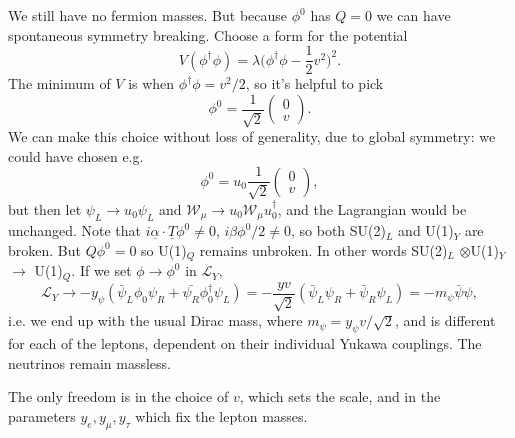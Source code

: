 We still have no fermion masses. But because $\phi^0$ has $Q=0$ we can have spontaneous symmetry breaking. Choose a form for the potential
\begin{equation}
V(\phi^\dagger \phi) = \lambda \bigg(\phi^\dagger \phi - \frac{1}{2}v^2\bigg)^2.
\end{equation}
The minimum of $V$ is when $\phi^\dagger \phi = v^2/2$, so it's helpful to pick 
\[\phi^0 = \frac{1}{\sqrt{2}}\left( \begin{array}{cc}
0   \\
v   \end{array} \right). \]
We can make this choice without loss of generality, due to global symmetry: we could have chosen e.g.
\[\phi^0 = u_0\frac{1}{\sqrt{2}} \left( \begin{array}{cc}
0   \\
v   \end{array} \right), \]
but then let $\psi_L \to u_0 \psi_L$ and $\mathcal{W}_\mu \to u_0 \mathcal{W}_\mu u_0^\dagger$, and the Lagrangian would be unchanged.
Note that $i \underline{\alpha}\cdot \underline{T} \phi^0 \neq 0$, $i\beta\phi^0/2 \neq 0$, so both SU(2)$_L$ and U(1)$_Y$ are broken. But $Q\phi^0 = 0$ so U(1)$_Q$ remains unbroken. In other words SU(2)$_L$ $\otimes$U(1)$_Y$ $\to$ U(1)$_Q$. If we set $\phi \to \phi^0$ in $\mathcal{L}_Y$,
\begin{equation}
\mathcal{L}_Y \to -y_\psi (\bar{\psi}_L \phi_0 \psi_R + \bar{\psi_R} \phi_0^\dagger \psi_L) = -\frac{yv}{\sqrt{2}}(\bar{\psi}_L \psi_R + \bar{\psi}_R \psi_L) = -m_\psi \bar{\psi} \psi,
\end{equation}
i.e. we end up with the usual Dirac mass, where $m_\psi = y_\psi v/\sqrt{2}$, and is different for each of the leptons, dependent on their individual Yukawa couplings. The neutrinos remain massless. 

The only freedom is in the choice of $v$, which sets the scale, and in the parameters $y_e, y_\mu, y_\tau$ which fix the lepton masses.

